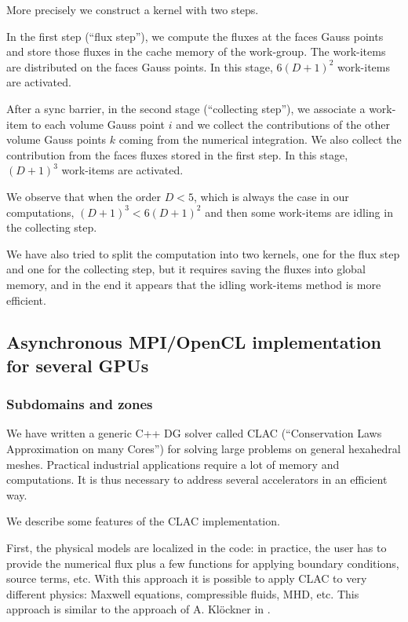 \documentclass[12pt]{amsart}
\begin{document}
More precisely we construct a kernel with two steps.

In the first step (``flux step''), we compute the fluxes at the faces Gauss points and store those fluxes in the cache memory of the work-group. The work-items are distributed on the faces Gauss points. In this stage, $6(D+1)^2$ work-items are activated.

After a sync barrier, in the second stage (``collecting step''), we associate a work-item to each volume Gauss point $i$ and we collect the contributions of the other volume Gauss points
$k$ coming from the numerical integration. We also collect the contribution from the faces fluxes stored in the first step. In this stage, $(D+1)^3$ work-items are activated.

We observe that when the order $D<5$, which is always the case in our computations, $(D+1)^3 < 6 (D+1)^2$ and then some work-items are idling in the collecting step.

We have also tried to split the computation into two kernels, one for the flux step and one for the collecting step, but it requires saving the fluxes into global memory, and in the end it appears that the idling work-items method is more efficient.



\subsection{Asynchronous MPI/OpenCL implementation for several GPUs}

\subsubsection{Subdomains and zones}
We have written a generic C++ DG solver called CLAC (``Conservation Laws Approximation on many Cores'') for solving large problems on general hexahedral meshes. Practical industrial applications require a lot of memory and computations. It is thus necessary to address several accelerators in an efficient way.

We describe some features of the CLAC implementation.

First, the physical models are localized in the code: in practice, the user has to provide the numerical flux plus a few functions for applying boundary conditions, source terms, etc. With this approach it is possible to apply CLAC to very different physics:  Maxwell equations, compressible fluids, MHD, etc. This approach is similar to the approach of A. Klöckner in \cite{kloeckner2010hedge}.
\end{document}
